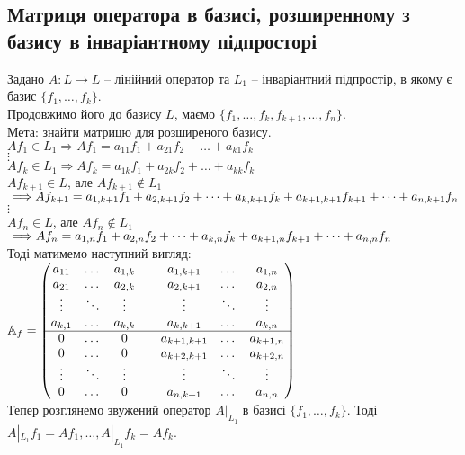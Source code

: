 \documentclass[a4paper, 10pt]{article}
\theoremstyle{theoremdd}
\begin{document}
\subsection{Матриця оператора в базисі, розширенному з базису в інваріантному підпросторі}
Задано $A \colon L \to L$ -- лінійний оператор та $L_1$ -- інваріантний підпростір, в якому є базис $\{f_1,\dots, f_k\}$.\\
Продовжимо його до базису $L$, маємо $\{f_1,\dots,f_k,f_{k+1},\dots,f_n\}$. \\
Мета: знайти матрицю для розширеного базису.\\
$Af_1 \in L_1 \Rightarrow Af_1 = a_{11}f_1 + a_{21}f_2 + \dots + a_{k1}f_k$\\
$\vdots$\\
$Af_k \in L_1 \Rightarrow Af_k = a_{1k}f_1 + a_{2k}f_2 + \dots + a_{kk}f_k$\\
$Af_{k+1} \in L $, але $Af_{k+1} \notin L_1$ $\implies \\ Af_{k+1} = a_{1,k+1}f_1 + a_{2,k+1}f_2 + \dots + a_{k,k+1}f_k + a_{k+1,k+1}f_{k+1} + \dots + a_{n,k+1}f_n$\\
$\vdots$\\
$Af_n \in L $, але $Af_n \notin L_1$ $\implies \\ Af_n = a_{1,n}f_1 + a_{2,n}f_2 + \dots + a_{k,n}f_k + a_{k+1,n}f_{k+1} + \dots + a_{n,n}f_n$\\
Тоді матимемо наступний вигляд:\\
$\mathbb{A}_f = \begin{pmatrix}
a_{11} & \dots & a_{1,k} & \vline & a_{1,k+1} & \dots & a_{1, n} \\
a_{21} & \dots & a_{2,k} & \vline & a_{2,k+1} & \dots & a_{2, n} \\
\vdots & \ddots & \vdots & \vline & \vdots & \ddots & \vdots \\
a_{k,1} & \dots & a_{k,k} & \vline & a_{k,k+1} & \dots & a_{k, n} \\
\hline
0 & \dots & 0 & \vline & a_{k+1,k+1} & \dots & a_{k+1, n} \\
0 & \dots & 0 & \vline & a_{k+2,k+1} &  \dots & a_{k+2, n} \\
\vdots & \ddots & \vdots & \vline & \vdots & \ddots & \vdots \\
0 & \dots & 0 & \vline & a_{n,k+1} & \dots & a_{n, n} \\
\end{pmatrix}$
\bigskip \\
Тепер розглянемо звужений оператор $A|_{L_1}$ в базисі $\{f_1,\dots,f_k\}$. Тоді $A|_{L_1} f_1 = Af_1 , \dots, A|_{L_1}f_k = Af_k$.\\
\end{document}
